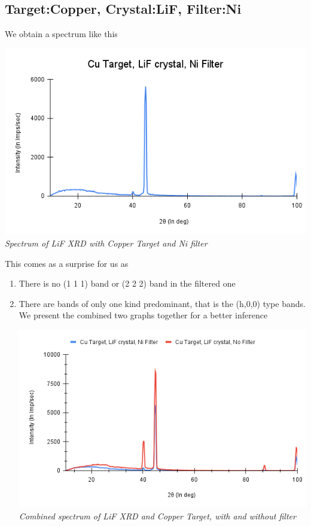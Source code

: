 \documentclass[]{report}[12 pt]
\begin{document}
\subsection*{Target:Copper, Crystal:LiF, Filter:Ni}
We obtain a spectrum like this\\
\begin{center}
	\includegraphics[width=10 cm]{Cu Target, LiF crystal, Ni Filter.png}\\
	\textit{Spectrum of LiF XRD with Copper Target and Ni filter}
\end{center}
This comes as a surprise for us as
\begin{enumerate}
	\item There is no (1 1 1) band or (2 2 2) band in the filtered one
	\item There are bands of only one kind predominant, that is the (h,0,0) type bands. We present the combined two graphs together for a better inference
		\begin{center}
		\includegraphics[width=10 cm]{comb1.png}\\
		\textit{Combined spectrum of LiF XRD and Copper Target, with and without filter}
	\end{center}
\end{enumerate}
\end{document}
